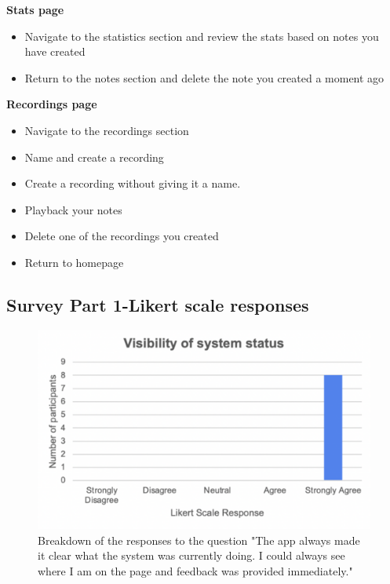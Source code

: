 \documentclass{l4proj}
\begin{document}
\begin{appendices}
\textbf{Stats page}

\begin{itemize}
    \item Navigate to the statistics section and review the stats based on notes you have created
    \item Return to the notes section and delete the note you created a moment ago
\end{itemize}

\textbf{Recordings page}

\begin{itemize}
    \item Navigate to the recordings section
    \item Name and create a recording
    \item Create a recording without giving it a name.
    \item Playback your notes
    \item Delete one of the recordings you created
    \item Return to homepage
\end{itemize}


\subsection{Survey Part 1-Likert scale responses} \label{Appendix-surveyP1-individualHeuristicGraphs}

\begin{figure}[H]
    \begin{centering}
    \includegraphics[scale=0.5]{images/heuristic1.pdf}
    \caption{Breakdown of the responses to the question "The app always made it clear what the system was currently doing. I could always see where I am on the page and feedback was provided immediately."}
    \label{fig: heuristic1}
    \end{centering}
\end{figure}


\end{appendices}
\end{document}
